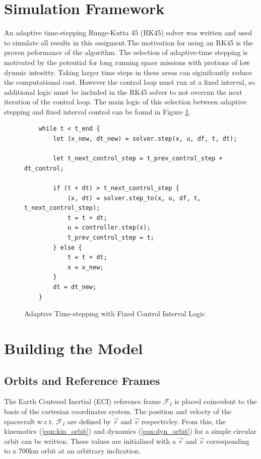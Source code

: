 \documentclass{article}
\begin{document}
\section{Simulation Framework}

An adaptive time-stepping Runge-Kutta 45 (RK45) solver was written and used to simulate all results in this assigment.The motivation for using an RK45 is the proven peformance of the algorithm. The selection of adaptive-time stepping is motivated by the potential for long running space missions with protions of low dynmic intesitty. Taking larger time steps in these areas can siginifcantly reduce the computational cost. However the control loop must run at a fixed interval, so additional logic must be included in the RK45 solver to not overrun the next iteration of the control loop. The main logic of this selection between adaptive stepping and fixed interval control can be found in Figure \ref{fig:main_loop}.

\begin{figure}[h]
	\begin{verbatim}
    while t < t_end {
        let (x_new, dt_new) = solver.step(x, u, df, t, dt);

        let t_next_control_step = t_prev_control_step + dt_control;

        if (t + dt) > t_next_control_step {
            (x, dt) = solver.step_to(x, u, df, t, t_next_control_step);
            t = t + dt;
            u = controller.step(x);
            t_prev_control_step = t;
        } else {
            t = t + dt;
            x = x_new;
        }
        dt = dt_new;
    }
	\end{verbatim}
	\caption{Adaptive Time-stepping with Fixed Control Interval Logic}
	\label{fig:main_loop}
\end{figure}

\section{Building the Model}

\subsection{Orbits and Reference Frames}

The Earth Centered Inertial (ECI) reference frame $\mathcal{F}_I$ is placed coincedent to the basis of the cartesian coordinates system. The position and velocty of the spacecraft w.r.t. $\mathcal{F}_I$ are defined by $\vec{r}$ and $\vec{v}$ respectivley. From this, the kinematics (\ref{eqn:kin_orbit}) and dynamics (\ref{eqn:dyn_orbit}) for a simple circular orbit can be written. These values are initialized with a $\vec{r}$ and $\vec{v}$ corresponding to a 700km orbit at an arbitrary inclication.
\end{document}
